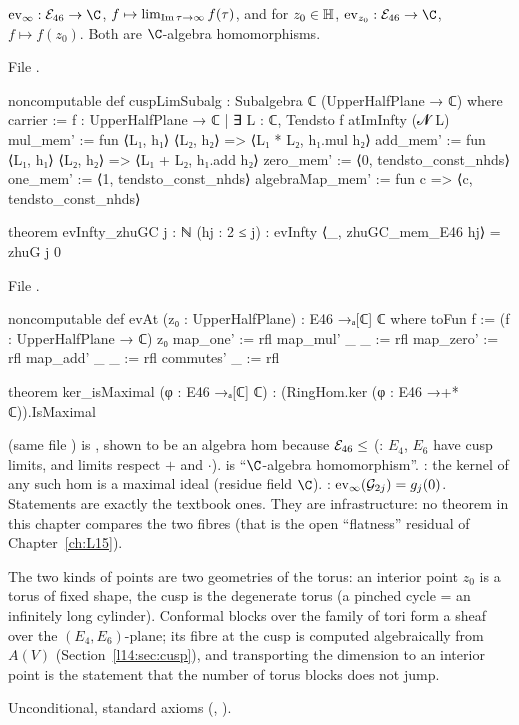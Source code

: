 \begin{definition}\label{l14:def:evInfty}
$\lfourteenev_\infty:\lfourteenE\to\C$, $f\mapsto\lim_{\operatorname{Im}\tau\to\infty}f(\tau)$, and for $z_0\in\mathbb{H}$,
$\lfourteenev_{z_0}:\lfourteenE\to\C$, $f\mapsto f(z_0)$. Both are $\C$-algebra homomorphisms.
\end{definition}
\noindent File .
\begin{leancode}
noncomputable def cuspLimSubalg : Subalgebra ℂ (UpperHalfPlane → ℂ) where
  carrier := {f : UpperHalfPlane → ℂ | ∃ L : ℂ, Tendsto f atImInfty (𝓝 L)}
  mul_mem' := fun ⟨L₁, h₁⟩ ⟨L₂, h₂⟩ => ⟨L₁ * L₂, h₁.mul h₂⟩
  add_mem' := fun ⟨L₁, h₁⟩ ⟨L₂, h₂⟩ => ⟨L₁ + L₂, h₁.add h₂⟩
  zero_mem' := ⟨0, tendsto_const_nhds⟩
  one_mem' := ⟨1, tendsto_const_nhds⟩
  algebraMap_mem' := fun c => ⟨c, tendsto_const_nhds⟩

theorem evInfty_zhuGC {j : ℕ} (hj : 2 ≤ j) :
    evInfty ⟨_, zhuGC_mem_E46 hj⟩ = zhuG j 0
\end{leancode}
\noindent File .
\begin{leancode}
noncomputable def evAt (z₀ : UpperHalfPlane) : E46 →ₐ[ℂ] ℂ where
  toFun f := (f : UpperHalfPlane → ℂ) z₀
  map_one' := rfl
  map_mul' _ _ := rfl
  map_zero' := rfl
  map_add' _ _ := rfl
  commutes' _ := rfl

theorem ker_isMaximal (φ : E46 →ₐ[ℂ] ℂ) :
    (RingHom.ker (φ : E46 →+* ℂ)).IsMaximal
\end{leancode}
\begin{dictionary}
 (same file ) is , shown to be an algebra hom because
$\mathcal{E}_{46}\le$  (: $E_4$, $E_6$ have cusp limits, and limits respect
$+$ and $\cdot$).  is ``$\C$-algebra homomorphism''. : the kernel of any such hom is a maximal
ideal (residue field $\C$). : $\mathrm{ev}_\infty(\mathcal G_{2j}) = g_j(0)$. Statements are exactly the
textbook ones. They are infrastructure: no theorem in this chapter compares the two fibres (that is the open ``flatness''
residual of Chapter~\ref{ch:L15}).
\end{dictionary}
\begin{physics}
The two kinds of points are two geometries of the torus: an interior point $z_0$ is a torus of fixed shape, the cusp is the
degenerate torus (a pinched cycle = an infinitely long cylinder). Conformal blocks over the family of tori form a sheaf over
the $(E_4,E_6)$-plane; its fibre at the cusp is computed algebraically from $A(V)$ (Section~\ref{l14:sec:cusp}), and
transporting the dimension to an interior point is the statement that the number of torus blocks does not jump.
\end{physics}
\begin{status}
Unconditional, standard axioms (, ).
\end{status}

